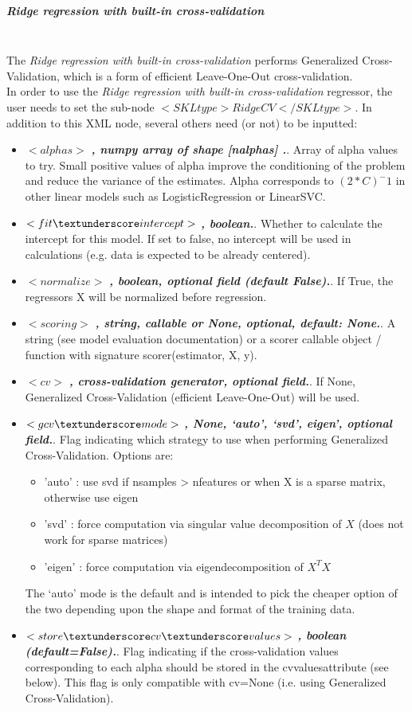 \subparagraph{Ridge regression with built-in cross-validation}
\mbox{}
\\The \textit{Ridge regression with built-in cross-validation} performs Generalized Cross-Validation, which is a form of efficient Leave-One-Out cross-validation.
\\In order to use the \textit{Ridge regression with built-in cross-validation} regressor, the user needs to set the sub-node $<SKLtype>RidgeCV</SKLtype>$.
In addition to this XML node, several others need (or not) to be inputted:
\begin{itemize}
  \item $<alphas>$ \textbf{\textit{, numpy array of shape [n\textunderscore alphas] .}}. Array of alpha values to try. Small positive values of alpha improve the conditioning of the problem and reduce the variance of the estimates. Alpha corresponds to $(2*C)^-1$ in other linear models such as LogisticRegression or LinearSVC.
  \item $<fit\textunderscore intercept>$ \textbf{\textit{, boolean.}}. Whether to calculate the intercept for this model. If set to false, no intercept will be used in calculations (e.g. data is expected to be already centered).
  \item $<normalize>$ \textbf{\textit{, boolean, optional field (default False).}}. If True, the regressors X will be normalized before regression.
  \item $<scoring>$ \textbf{\textit{, string, callable or None, optional, default: None.}}. A string (see model evaluation documentation) or a scorer callable object / function with signature scorer(estimator, X, y).
  \item $<cv>$ \textbf{\textit{, cross-validation generator, optional field.}}. If None, Generalized Cross-Validation (efficient Leave-One-Out) will be used.
  \item $<gcv\textunderscore mode>$ \textbf{\textit{, {None, ‘auto’, ‘svd’, eigen’}, optional field.}}. Flag indicating which strategy to use when performing Generalized Cross-Validation. Options are:
				\begin{itemize}
				  \item 'auto' : use svd if n\textunderscore samples > n\textunderscore features or when X is a sparse matrix, otherwise use eigen
				  \item 'svd' : force computation via singular value decomposition of $X$ (does not work for sparse matrices)
				  \item 'eigen' : force computation via eigendecomposition of $X^T X$
				 \end{itemize}
				The ‘auto’ mode is the default and is intended to pick the cheaper option of the two depending upon the shape and format of the training data.
  \item $<store\textunderscore cv\textunderscore values>$ \textbf{\textit{, boolean (default=False).}}. Flag indicating if the cross-validation values corresponding to each alpha should be stored in the cv\textunderscore values\textunderscore  attribute (see below). This flag is only compatible with cv=None (i.e. using Generalized Cross-Validation).
\end{itemize}

